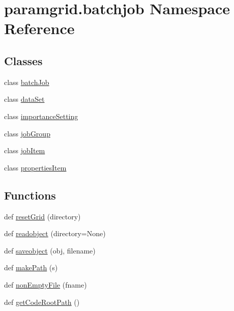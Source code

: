 \hypertarget{namespaceparamgrid_1_1batchjob}{}\section{paramgrid.\+batchjob Namespace Reference}
\label{namespaceparamgrid_1_1batchjob}
\subsection*{Classes}
\begin{DoxyCompactItemize}
\item 
class \mbox{\hyperlink{classparamgrid_1_1batchjob_1_1batchJob}{batch\+Job}}
\item 
class \mbox{\hyperlink{classparamgrid_1_1batchjob_1_1dataSet}{data\+Set}}
\item 
class \mbox{\hyperlink{classparamgrid_1_1batchjob_1_1importanceSetting}{importance\+Setting}}
\item 
class \mbox{\hyperlink{classparamgrid_1_1batchjob_1_1jobGroup}{job\+Group}}
\item 
class \mbox{\hyperlink{classparamgrid_1_1batchjob_1_1jobItem}{job\+Item}}
\item 
class \mbox{\hyperlink{classparamgrid_1_1batchjob_1_1propertiesItem}{properties\+Item}}
\end{DoxyCompactItemize}
\subsection*{Functions}
\begin{DoxyCompactItemize}
\item 
def \mbox{\hyperlink{namespaceparamgrid_1_1batchjob_a401180cffb94a943e7b5b87dc61ef71f}{reset\+Grid}} (directory)
\item 
def \mbox{\hyperlink{namespaceparamgrid_1_1batchjob_a45df97d60ead0891964ff9f217b24deb}{readobject}} (directory=None)
\item 
def \mbox{\hyperlink{namespaceparamgrid_1_1batchjob_ab909ba8e3e40ef0f62bd3bff2dc06587}{saveobject}} (obj, filename)
\item 
def \mbox{\hyperlink{namespaceparamgrid_1_1batchjob_ae6ee53e74125f0133a126bc61c38da4c}{make\+Path}} (s)
\item 
def \mbox{\hyperlink{namespaceparamgrid_1_1batchjob_a3d80de6ff349ffa506ff5bedefa9f830}{non\+Empty\+File}} (fname)
\item 
def \mbox{\hyperlink{namespaceparamgrid_1_1batchjob_a74f8d3e87c0cd26fd4a0b514048b1539}{get\+Code\+Root\+Path}} ()
\end{DoxyCompactItemize}


